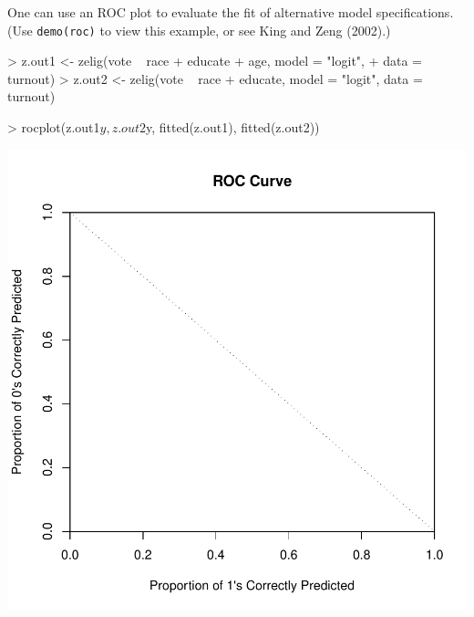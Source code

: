 \begin{enumerate}
  One can use an ROC plot to evaluate the fit of alternative model
  specifications.  (Use {\tt demo(roc)} to view this example, or see
  King and Zeng (2002)\nocite{KinZen02}.)  
\begin{Schunk}
\begin{Sinput}
> z.out1 <- zelig(vote ~ race + educate + age, model = "logit", 
+     data = turnout)
> z.out2 <- zelig(vote ~ race + educate, model = "logit", data = turnout)
\end{Sinput}
\end{Schunk}
\begin{center}
\begin{Schunk}
\begin{Sinput}
> rocplot(z.out1$y, z.out2$y, fitted(z.out1), fitted(z.out2))
\end{Sinput}
\end{Schunk}
\includegraphics{vigpics/logit-ROCPlot}
\end{center}
\end{enumerate}

